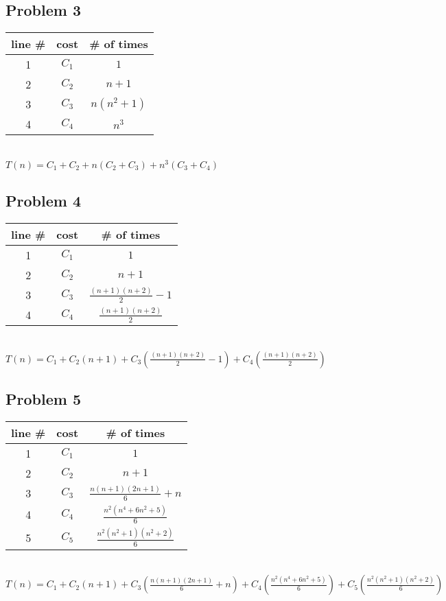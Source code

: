 \documentclass[a4paper,12pt]{article}
\begin{document}
        \subsection{Problem 3}
        \begin{center}
        \begin{tabular}{ c|c|c }
        line \# & cost & \# of times \\
        \hline
        1 & $C_1$ & $1$ \\
        2 & $C_2$ & $n + 1$ \\
        3 & $C_3$ & $n(n^2 + 1)$ \\
        4 & $C_4$ & $n^3$ \\
        \end{tabular} \\
        \vspace{5mm}
        $T(n) = C_1 + C_2 +n(C_2 +C_3) + n^3(C_3 + C_4)$
        \end{center}	        
        
        \subsection{Problem 4}
        \begin{center}
        \begin{tabular}{ c|c|c }
        line \# & cost & \# of times \\
        \hline
        1 & $C_1$ & $1$ \\
        2 & $C_2$ & $n + 1$ \\
        3 & $C_3$ & $\frac{(n + 1)(n + 2)}{2} - 1$ \\
        4 & $C_4$ & $\frac{(n + 1)(n + 2)}{2}$ \\
        \end{tabular} \\
        \vspace{5mm}
        $T(n) = C_1 + C_2(n + 1) + C_3(\frac{(n+1)(n+2)}{2} - 1) + C_4(\frac{(n+1)(n+2)}{2})$
        \end{center}
        
        \subsection{Problem 5}
        \begin{center}
        \begin{tabular}{ c|c|c }
        line \# & cost & \# of times \\
        \hline
        1 & $C_1$ & $1$ \\
        2 & $C_2$ & $n + 1$ \\
        3 & $C_3$ & $\frac{n(n + 1)(2n + 1)}{6} + n$ \\
        4 & $C_4$ & $\frac{n^2(n^4 + 6n^2 + 5)}{6}$ \\
        5 & $C_5$ & $\frac{n^2(n^2 + 1)(n^2 + 2)}{6}$ \\
        \end{tabular} \\
        \vspace{5mm}
        $T(n) = C_1 + C_2(n + 1) + C_3(\frac{n(n + 1)(2n + 1)}{6} + n) + C_4(\frac{n^2(n^4 + 6n^2 + 5)}{6}) + C_5(\frac{n^2(n^2 + 1)(n^2 + 2)}{6})$
        \end{center}
        
\end{document}
